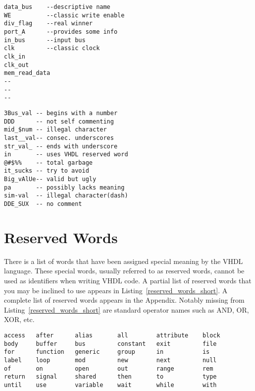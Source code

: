 \noindent
\begin{minipage}[lt]{0.49\linewidth}
\vspace{5pt}
\begin{lstlisting}[label=valid_identif, caption=Valid identifies.]
data_bus	--descriptive name
WE			--classic write enable
div_flag	--real winner
port_A		--provides some info
in_bus		--input bus
clk			--classic clock
clk_in
clk_out
mem_read_data
--
--
--
\end{lstlisting}
\end{minipage}
\begin{minipage}[tr]{0.49\linewidth}
\vspace{5pt}
\begin{flushright}
\begin{lstlisting}[label=invalid_identif, caption=Invalid identifies.]
3Bus_val -- begins with a number
DDD      -- not self commenting
mid_$num -- illegal character
last__val-- consec. underscores
str_val_ -- ends with underscore
in       -- uses VHDL reserved word
@#$%%    -- total garbage
it_sucks -- try to avoid
Big_vAlUe-- valid but ugly
pa       -- possibly lacks meaning
sim-val  -- illegal character(dash)
DDE_SUX  -- no comment
\end{lstlisting}
\end{flushright}
\end{minipage}

\section{Reserved Words}
There is a list of words that have been assigned special meaning by the VHDL language. These special words, usually referred to as reserved words, cannot be used as identifiers when writing VHDL code. A partial list of reserved words that you may be inclined to use appears in Listing~\ref{reserved_words_short}. A complete list of reserved words appears in the Appendix. Notably missing from Listing~\ref{reserved_words_short} are standard operator names such as AND, OR, XOR, etc.

\noindent
\begin{minipage}{0.99\linewidth}
\begin{lstlisting}[label=reserved_words_short, caption=A short list of VHDL reserved words.]
access   after      alias       all        attribute    block
body     buffer     bus         constant   exit         file
for      function   generic     group      in           is
label    loop       mod         new        next         null
of       on         open        out        range        rem
return   signal     shared      then       to           type
until    use        variable    wait       while        with
\end{lstlisting}
\end{minipage}

